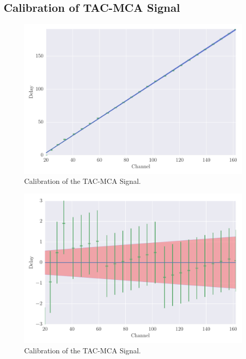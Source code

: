 \subsection{Calibration of TAC-MCA Signal}
\label{sub:calibration_of_tac_mca_signal}
\begin{figure}[htpb]
    \centering
    \includegraphics[width=1.0\linewidth]{analysis/figures/plot7}
    \caption{Calibration of the TAC-MCA Signal.}
    \label{fig:plot7}
\end{figure}
\begin{figure}[htpb]
    \centering
    \includegraphics[width=1.0\linewidth]{analysis/figures/plot7b}
    \caption{Calibration of the TAC-MCA Signal.}
    \label{fig:plot7}
\end{figure}



